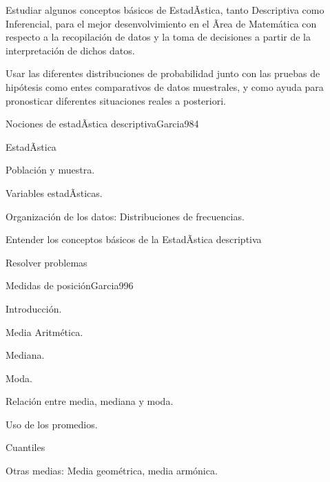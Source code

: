 \begin{syllabus}


\begin{goals}
\item  Estudiar algunos conceptos básicos de EstadÃ­stica, tanto Descriptiva como Inferencial, para el mejor desenvolvimiento en el Ãrea de Matemática con respecto a la recopilación de datos y la toma de decisiones a partir de la interpretación de dichos datos.
\item  Usar las diferentes distribuciones de probabilidad junto con las pruebas de hipótesis como entes comparativos de datos muestrales, y como ayuda para pronosticar diferentes situaciones reales a posteriori.
\end{goals}

\begin{outcomes}
\end{outcomes}

\begin{unit}{Nociones de estadÃ­stica descriptiva}{Garcia98}{4}
   \begin{topics}
         \item  EstadÃ­stica
	 \item  Población y muestra.
	 \item  Variables estadÃ­sticas.
         \item  Organización de los datos: Distribuciones de frecuencias.
   \end{topics}

   \begin{unitgoals}
         \item  Entender los conceptos básicos de la EstadÃ­stica descriptiva
         \item  Resolver problemas
   \end{unitgoals}
\end{unit}

\begin{unit}{Medidas de posición}{Garcia99}{6}
   \begin{topics}
	\item Introducción.
	\item Media Aritmética.
	\item Mediana.
	\item Moda.
	\item Relación entre media, mediana y moda.
	\item Uso de los promedios.
	\item Cuantiles
	\item Otras medias: Media geométrica, media armónica.
   \end{topics}


\end{unit}
\end{syllabus}
